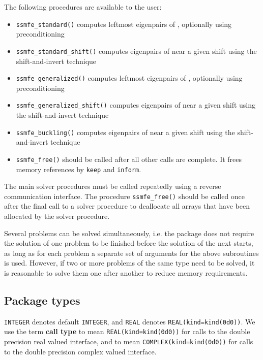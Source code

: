\medskip

\noindent The following procedures are available to the user:
%
\begin{itemize}
\vspace{-0.1cm}
\item {\tt ssmfe\_standard()} 
computes leftmost eigenpairs of , 
optionally using preconditioning
\item {\tt ssmfe\_standard\_shift()} 
computes eigenpairs of  near a given shift
using the shift-and-invert technique
\item {\tt ssmfe\_generalized()} 
computes leftmost eigenpairs of 
, optionally using preconditioning
\item {\tt ssmfe\_generalized\_shift()} 
computes eigenpairs of 
 near a given shift
using the shift-and-invert technique
\item {\tt ssmfe\_buckling()} 
computes eigenpairs of 
 near a given shift
using the shift-and-invert technique
\item {\tt ssmfe\_free()} should be called after all other calls
are complete. It frees memory references by \texttt{keep} and \texttt{inform}.
%
\end{itemize}

The main solver procedures
must be called repeatedly using
a reverse communication interface.
The procedure \texttt{ssmfe\_free()}
should be called once after the
final call to 
a solver procedure
to deallocate all arrays 
that have been allocated by
the solver procedure.

Several problems can be solved simultaneously,
i.e. the package does not require the solution of
one problem to be finished before the solution of
the next starts, as long as for each problem a separate set
of arguments for the above subroutines is used.
However, if two or more problems of the same type
need to be solved, it is reasonable to solve them one
after another  to reduce  memory requirements.
\fi

\subsection{Package types} 

\texttt{INTEGER} denotes default \texttt{INTEGER}, and \texttt{REAL} denotes
\texttt{REAL(kind=kind(0d0))}. We use the term {\bf call type} to mean
\texttt{REAL(kind=kind(0d0))} for calls to the double precision real valued
interface, and to mean \texttt{COMPLEX(kind=kind(0d0))} for calls to the double
precision complex valued interface.

